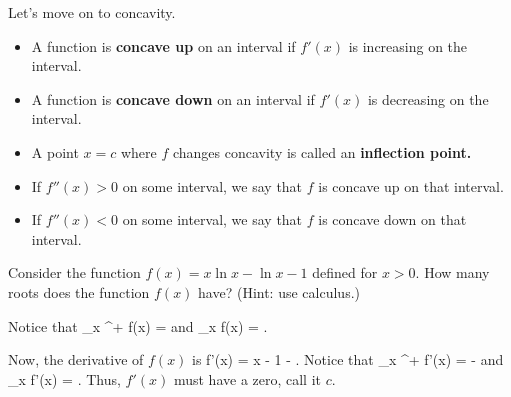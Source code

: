 \documentclass[11pt]{amsart}
\begin{document}
\vspace{2cm} 

Let's move on to concavity. 
\begin{itemize} 
\item A function is {\bf concave up} on an interval if $f'(x)$ is increasing on the interval. 
\item A function is {\bf concave down} on an interval if $f'(x)$ is decreasing on the interval. 
\item A point $x = c$ where $f$ changes concavity is called an {\bf inflection point.}
\end{itemize} 


\begin{itemize}
\item If $f''(x) > 0$ on some interval, we say that $f$ is concave up on that interval. 
\item If $f''(x) < 0$ on some interval, we say that $f$ is concave down on that interval. 
\end{itemize} 




\newpage

\begin{eg} Consider the function $f(x) = x \ln x - \ln x - 1$ defined for $x > 0$. 
How many roots does the function $f(x)$ have? 
(Hint: use calculus.)
\end{eg} 

\newpage 

Notice that 
\beqn
\lim_{x ^+} f(x) = \infty 
\eeqn
and 
\beqn
\lim_{x \to \infty} f(x) = \infty .
\eeqn

Now, the derivative of $f(x)$ is
\beqn
f'(x) = \ln x - 1 -  . 
\eeqn
Notice that 
\beqn
\lim_{x ^+} f'(x) = - \infty 
\eeqn
and 
\beqn
\lim_{x \to \infty} f'(x) = \infty .
\eeqn
Thus, $f'(x)$ must have a zero, call it $c$. 

\end{document}
